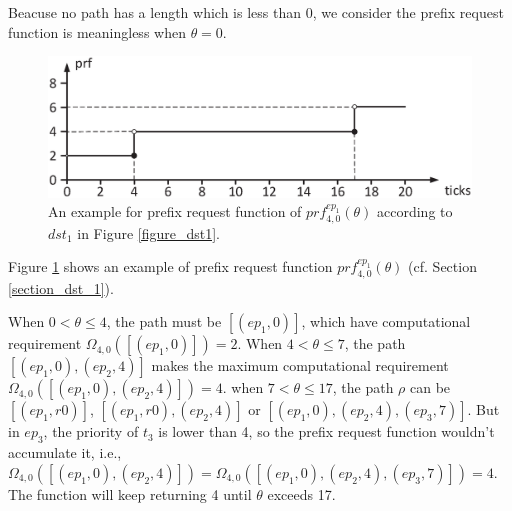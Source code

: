\documentclass[sigconf]{acmart}
\begin{document}
Beacuse no path has a length which is less than 0, we consider the prefix request function is meaningless when $\theta=0$.


\begin{figure}[t]
  \centering
  \includegraphics[scale=0.32]{graphics/figure_prf.eps}
  \caption{An example for prefix request function of $prf^{ep_1}_{4,0}(\theta)$ according to $dst_1$ in Figure \ref{figure_dst1}.} 
  \label{figure_prf}
\end{figure}

Figure \ref{figure_prf} shows an example of prefix request function $prf^{ep_1}_{4,0}(\theta)$ (cf. Section \ref{section_dst_1}). 

When $0<\theta\leq4$, the path must be $[(ep_1,0)]$, which have computational requirement $\Omega_{4,0}([(ep_1,0)])=2$. When $4<\theta\leq7$, the path $[(ep_1,0),(ep_2,4)]$ makes the maximum computational requirement $\Omega_{4,0}([(ep_1,0),(ep_2,4)])=4$. when $7<\theta\leq17$, the path $\rho$ can be $[(ep_1,r0)]$, $[(ep_1,r0),(ep_2,4)]$ or $[(ep_1,0),(ep_2,4),(ep_3,7)]$. But in $ep_3$, the priority of $t_3$ is lower than 4, so the prefix request function wouldn't accumulate it, i.e., $\Omega_{4,0}([(ep_1,0),(ep_2,4)])=\Omega_{4,0}([(ep_1,0),(ep_2,4),(ep_3,7)])=4$. The function will keep returning 4 until $\theta$ exceeds 17.
\end{document}
